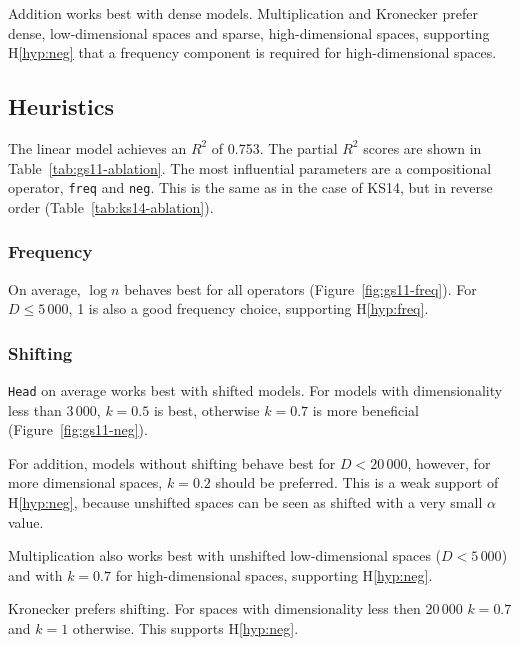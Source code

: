 Addition works best with dense models. Multiplication and Kronecker prefer dense, low-dimensional spaces and sparse, high-dimensional spaces, supporting H\ref{hyp:neg} that a frequency component is required for high-dimensional spaces.

\subsection{Heuristics}
\label{sec:heuristics-gs11}



The linear model achieves an $R^2$ of 0.753. The partial $R^2$ scores are shown in Table~\ref{tab:gs11-ablation}. The most influential parameters are a compositional operator, \texttt{freq} and \texttt{neg}. This is the same as in the case of KS14, but in reverse order (Table~\ref{tab:ks14-ablation}).


\subsubsection{Frequency}



On average, $\log n$ behaves best for all operators (Figure~\ref{fig:gs11-freq}). For $D \leq 5\,000$, 1 is also a good frequency choice, supporting H\ref{hyp:freq}.
% 

\subsubsection{Shifting}

\texttt{Head} on average works best with shifted models. For models with dimensionality less than 3\,000, $k = 0.5$ is best, otherwise $k = 0.7$ is more beneficial (Figure~\ref{fig:gs11-neg}).

For addition, models without shifting behave best for $D < 20\,000$, however, for more dimensional spaces, $k = 0.2$ should be preferred. This is a weak support of H\ref{hyp:neg}, because unshifted spaces can be seen as shifted with a very small $\alpha$ value.

Multiplication also works best with unshifted low-dimensional spaces ($D < 5\,000$) and with $k = 0.7$ for high-dimensional spaces, supporting H\ref{hyp:neg}.

Kronecker prefers shifting. For spaces with dimensionality less then 20\,000 $k = 0.7$ and $k = 1$ otherwise. This supports H\ref{hyp:neg}.

